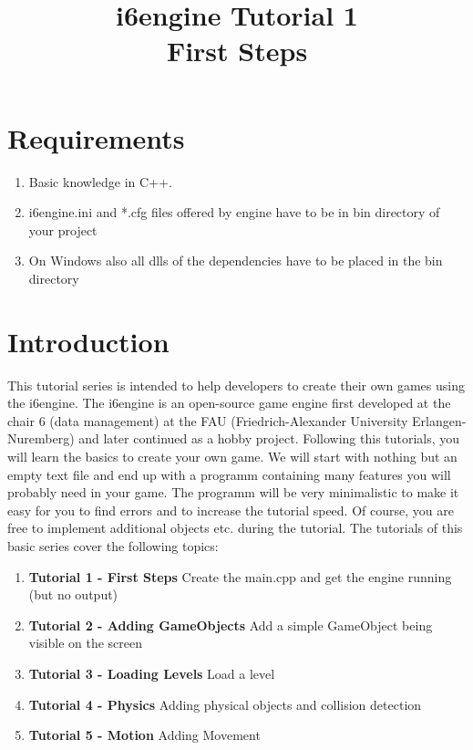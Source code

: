 \documentclass{article}
\title{i6engine Tutorial 1 \\ First Steps}
\begin{document}
\section{Requirements}


\begin{enumerate}
\item Basic knowledge in C++.
\item i6engine.ini and *.cfg files offered by engine have to be in bin directory of your project
\item On Windows also all dlls of the dependencies have to be placed in the bin directory
\end{enumerate}

\section{Introduction}

This tutorial series is intended to help developers to create their own games using the i6engine. The i6engine is an open-source game engine first developed at the chair 6 (data management) at the FAU (Friedrich-Alexander University Erlangen-Nuremberg) and later continued as a hobby project.\newline
Following this tutorials, you will learn the basics to create your own game. We will start with nothing but an empty text file and end up with a programm containing many features you will probably need in your game. The programm will be very minimalistic to make it easy for you to find errors and to increase the tutorial speed. Of course, you are free to implement additional objects etc. during the tutorial.\newline
The tutorials of this basic series cover the following topics:\newline
\begin{enumerate}
\item \textbf{Tutorial 1 - First Steps} Create the main.cpp and get the engine running (but no output)
\item \textbf{Tutorial 2 - Adding GameObjects} Add a simple GameObject being visible on the screen
\item \textbf{Tutorial 3 - Loading Levels} Load a level
\item \textbf{Tutorial 4 - Physics} Adding physical objects and collision detection
\item \textbf{Tutorial 5 - Motion} Adding Movement
\end{enumerate}
\end{document}
